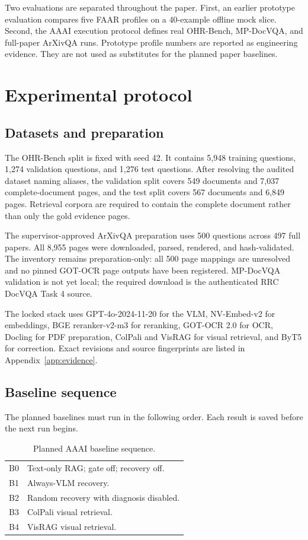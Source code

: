 \documentclass[10pt,twocolumn]{article}
\begin{document}
Two evaluations are separated throughout the paper. First, an earlier prototype evaluation compares five FAAR profiles on a 40-example offline mock slice. Second, the AAAI execution protocol defines real OHR-Bench, MP-DocVQA, and full-paper ArXivQA runs. Prototype profile numbers are reported as engineering evidence. They are not used as substitutes for the planned paper baselines.

\section{Experimental protocol}

\subsection{Datasets and preparation}

The OHR-Bench split is fixed with seed 42. It contains 5,948 training questions, 1,274 validation questions, and 1,276 test questions. After resolving the audited dataset naming aliases, the validation split covers 549 documents and 7,037 complete-document pages, and the test split covers 567 documents and 6,849 pages. Retrieval corpora are required to contain the complete document rather than only the gold evidence pages.

The supervisor-approved ArXivQA preparation uses 500 questions across 497 full papers. All 8,955 pages were downloaded, parsed, rendered, and hash-validated. The inventory remains preparation-only: all 500 page mappings are unresolved and no pinned GOT-OCR page outputs have been registered. MP-DocVQA validation is not yet local; the required download is the authenticated RRC DocVQA Task 4 source.

The locked stack uses GPT-4o-2024-11-20 for the VLM, NV-Embed-v2 for embeddings, BGE reranker-v2-m3 for reranking, GOT-OCR 2.0 for OCR, Docling for PDF preparation, ColPali and VisRAG for visual retrieval, and ByT5 for correction. Exact revisions and source fingerprints are listed in Appendix~\ref{app:evidence}.

\subsection{Baseline sequence}

The planned baselines must run in the following order. Each result is saved before the next run begins.

\begin{table}[H]
\centering
\caption{Planned AAAI baseline sequence.}
\label{tab:baselines}
\small
\begin{tabularx}{\columnwidth}{@{}lY@{}}
\toprule
B0 & Text-only RAG; gate off; recovery off. \\
B1 & Always-VLM recovery. \\
B2 & Random recovery with diagnosis disabled. \\
B3 & ColPali visual retrieval. \\
B4 & VisRAG visual retrieval. \\
\bottomrule
\end{tabularx}
\end{table}
\end{document}

